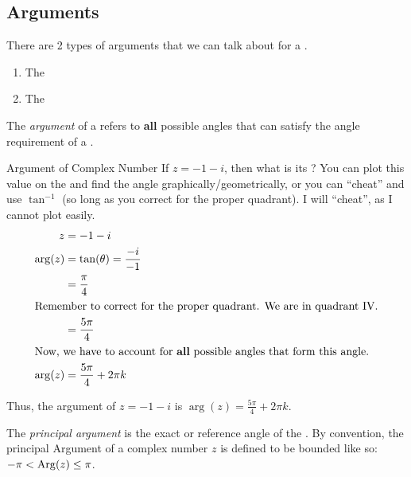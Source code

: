 \subsection{Arguments}\label{subsec:Complex_Number_Arguments}
There are 2 types of arguments that we can talk about for a .
\begin{enumerate}[noitemsep]
\item The 
\item The 
\end{enumerate}

\begin{definition}[Argument]\label{def:Complex_Number_Argument}
  The \emph{argument} of a  refers to \textbf{all} possible angles that can satisfy the angle requirement of a .
\end{definition}

\begin{example}{Argument of Complex Number}
  If $z = -1 - i$, then what is its \textbf{}?
  \tcblower{}
  You can plot this value on the  and find the angle graphically/geometrically, or you can ``cheat'' and use $\tan^{-1}$ (so long as you correct for the proper quadrant).
  I will ``cheat'', as I cannot plot easily.
  \begin{align*}
    z &= -1 - i \\
    \arg(z) &= \tan(\theta) = \frac{-i}{-1} \\
      &= \frac{\pi}{4} \\
    \shortintertext{Remember to correct for the proper quadrant. We are in quadrant IV.}
      &= \frac{5 \pi}{4} \\
    \intertext{Now, we have to account for \textbf{all} possible angles that form this angle.}
    \arg(z) &= \frac{5 \pi}{4} + 2 \pi k
  \end{align*}

  Thus, the argument of $z = -1 - i$ is $\arg(z) = \frac{5 \pi}{4} + 2 \pi k$.
\end{example}

\begin{definition}\label{def:Principal_Argument}
  The \emph{principal argument} is the exact or reference angle of the .
  By convention, the principal Argument of a complex number $z$ is defined to be bounded like so: $-\pi < \operatorname{Arg}(z) \leq \pi$.
\end{definition}

